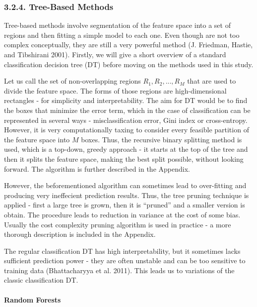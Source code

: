 \documentclass[12pt,]{article}
\let\oldparagraph\paragraph
\renewcommand{\paragraph}[1]{\oldparagraph{#1}\mbox{}}
\begin{document}
\hypertarget{tree-based-methods}{%
\subsubsection{3.2.4. Tree-Based Methods}\label{tree-based-methods}}

Tree-based methods involve segmentation of the feature space into a set
of regions and then fitting a simple model to each one. Even though are
not too complex conceptually, they are still a very powerful method (J.
Friedman, Hastie, and Tibshirani 2001). Firstly, we will give a short
overview of a standard classification decision tree (DT) before moving
on the methods used in this study.

Let us call the set of non-overlapping regions \(R_1,R_2,...,R_M\) that
are used to divide the feature space. The forms of those regions are
high-dimensional rectangles - for simplicity and interpretability. The
aim for DT would be to find the boxes that minimize the error term,
which in the case of classification can be represented in several ways -
misclassification error, Gini index or cross-entropy. However, it is
very computationally taxing to consider every feasible partition of the
feature space into \(M\) boxes. Thus, the recursive binary splitting
method is used, which is a top-down, greedy approach - it starts at the
top of the tree and then it splits the feature space, making the best
split possible, without looking forward. The algorithm is further
described in the Appendix.

However, the beforementioned algorithm can sometimes lead to
over-fitting and producing very ineffecient prediction results. Thus,
the tree pruning technique is applied - first a large tree is grown,
then it is ``pruned'' and a smaller version is obtain. The procedure
leads to reduction in variance at the cost of some bias. Usually the
cost complexity pruning algorithm is used in practice - a more thorough
description is included in the Appendix.

The regular classification DT has high interpretability, but it
sometimes lacks sufficient prediction power - they are often unstable
and can be too sensitive to training data (Bhattacharyya et al. 2011).
This leads us to variations of the classic classification DT.

\hypertarget{random-forests}{%
\paragraph{Random Forests}\label{random-forests}}
\end{document}
